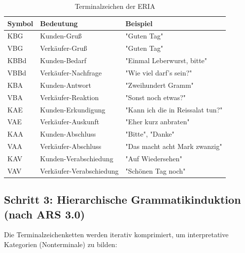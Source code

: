 \documentclass[12pt,a4paper]{article}
\begin{document}
\begin{table}[H]
\centering
\caption{Terminalzeichen der ERIA}
\label{tab:terminal}
\begin{tabular}{@{} l l l @{}}
\toprule
\textbf{Symbol} & \textbf{Bedeutung} & \textbf{Beispiel} \\
\midrule
KBG & Kunden-Gruß & "Guten Tag" \\
VBG & Verkäufer-Gruß & "Guten Tag" \\
KBBd & Kunden-Bedarf & "Einmal Leberwurst, bitte" \\
VBBd & Verkäufer-Nachfrage & "Wie viel darf's sein?" \\
KBA & Kunden-Antwort & "Zweihundert Gramm" \\
VBA & Verkäufer-Reaktion & "Sonst noch etwas?" \\
KAE & Kunden-Erkundigung & "Kann ich die in Reissalat tun?" \\
VAE & Verkäufer-Auskunft & "Eher kurz anbraten" \\
KAA & Kunden-Abschluss & "Bitte", "Danke" \\
VAA & Verkäufer-Abschluss & "Das macht acht Mark zwanzig" \\
KAV & Kunden-Verabschiedung & "Auf Wiedersehen" \\
VAV & Verkäufer-Verabschiedung & "Schönen Tag noch" \\
\bottomrule
\end{tabular}
\end{table}

\subsection{Schritt 3: Hierarchische Grammatikinduktion (nach ARS 3.0)}

Die Terminalzeichenketten werden iterativ komprimiert, um interpretative 
Kategorien (Nonterminale) zu bilden:
\end{document}
